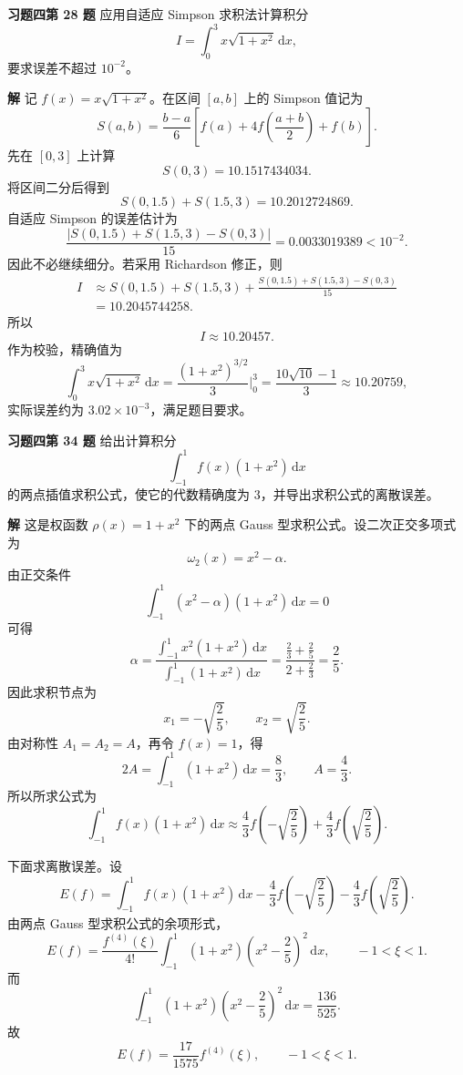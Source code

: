\documentclass[UTF8,a4paper,11pt]{ctexart}
\newcommand{\dd}{\,\mathrm{d}}
\begin{document}
\bigskip\bigskip

\noindent\textbf{习题四\quad 第 28 题}\quad
应用自适应 Simpson 求积法计算积分
\[
  I=\int_{0}^{3}x\sqrt{1+x^2}\dd x,
\]
要求误差不超过 $10^{-2}$。

\medskip
\noindent\textbf{解}\quad
记 $f(x)=x\sqrt{1+x^2}$。在区间 $[a,b]$ 上的 Simpson 值记为
\[
  S(a,b)=\frac{b-a}{6}
  \left[f(a)+4f\!\left(\frac{a+b}{2}\right)+f(b)\right].
\]
先在 $[0,3]$ 上计算
\[
  S(0,3)=10.1517434034.
\]
将区间二分后得到
\[
  S(0,1.5)+S(1.5,3)=10.2012724869.
\]
自适应 Simpson 的误差估计为
\[
  \frac{|S(0,1.5)+S(1.5,3)-S(0,3)|}{15}
  =0.0033019389<10^{-2}.
\]
因此不必继续细分。若采用 Richardson 修正，则
\[
\begin{aligned}
  I
  &\approx S(0,1.5)+S(1.5,3)
  +\frac{S(0,1.5)+S(1.5,3)-S(0,3)}{15} \\
  &=10.2045744258.
\end{aligned}
\]
所以
\[
  \boxed{I\approx 10.20457.}
\]
作为校验，精确值为
\[
  \int_0^3x\sqrt{1+x^2}\dd x
  =\frac{(1+x^2)^{3/2}}{3}\bigg|_0^3
  =\frac{10\sqrt{10}-1}{3}\approx 10.20759,
\]
实际误差约为 $3.02\times 10^{-3}$，满足题目要求。

\bigskip\bigskip

\noindent\textbf{习题四\quad 第 34 题}\quad
给出计算积分
\[
  \int_{-1}^{1}f(x)(1+x^2)\dd x
\]
的两点插值求积公式，使它的代数精确度为 $3$，并导出求积公式的离散误差。

\medskip
\noindent\textbf{解}\quad
这是权函数 $\rho(x)=1+x^2$ 下的两点 Gauss 型求积公式。设二次正交多项式为
\[
  \omega_2(x)=x^2-\alpha.
\]
由正交条件
\[
  \int_{-1}^{1}(x^2-\alpha)(1+x^2)\dd x=0
\]
可得
\[
  \alpha=
  \frac{\int_{-1}^{1}x^2(1+x^2)\dd x}
       {\int_{-1}^{1}(1+x^2)\dd x}
  =
  \frac{\frac23+\frac25}{2+\frac23}
  =\frac25.
\]
因此求积节点为
\[
  x_1=-\sqrt{\frac25},\qquad x_2=\sqrt{\frac25}.
\]
由对称性 $A_1=A_2=A$，再令 $f(x)=1$，得
\[
  2A=\int_{-1}^{1}(1+x^2)\dd x=\frac83,
  \qquad A=\frac43.
\]
所以所求公式为
\[
  \boxed{
  \int_{-1}^{1}f(x)(1+x^2)\dd x
  \approx
  \frac43 f\!\left(-\sqrt{\frac25}\right)
  +\frac43 f\!\left(\sqrt{\frac25}\right).}
\]

下面求离散误差。设
\[
  E(f)=\int_{-1}^{1}f(x)(1+x^2)\dd x
  -\frac43 f\!\left(-\sqrt{\frac25}\right)
  -\frac43 f\!\left(\sqrt{\frac25}\right).
\]
由两点 Gauss 型求积公式的余项形式，
\[
  E(f)=\frac{f^{(4)}(\xi)}{4!}
  \int_{-1}^{1}(1+x^2)
  \left(x^2-\frac25\right)^2\dd x,\qquad -1<\xi<1.
\]
而
\[
  \int_{-1}^{1}(1+x^2)
  \left(x^2-\frac25\right)^2\dd x
  =\frac{136}{525}.
\]
故
\[
  \boxed{E(f)=\frac{17}{1575}f^{(4)}(\xi),\qquad -1<\xi<1.}
\]
\end{document}
